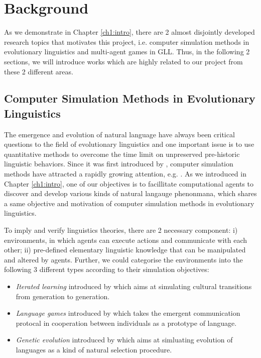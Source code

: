 \documentclass[msc,deptreport]{infthesis} %
\begin{document}

\chapter{Background}
\label{ch2:background}

As we demonstrate in Chapter \ref{ch1:intro}, there are 2 almost disjointly developed research topics that motivates this project, i.e. computer simulation methods in evolutionary linguistics and multi-agent games in GLL. Thus, in the following 2 sections, we will introduce works which are highly related to our project from these 2 different areas.

\section{Computer Simulation Methods in Evolutionary Linguistics}
\label{sec2.1:evolang}

The emergence and evolution of natural language have always been critical questions to the field of evolutionary linguistics \cite{macwhinney2013emergence} and one important issue is to use quantitative methods to overcome the time limit on unpreserved pre-historic linguistic behaviors\cite{lieberman2006toward, evans2009myth}. Since it was first introduced by \cite{hurford1989biological}, computer simulation methods have attracted a rapidly growing attention, e.g. \cite{hurford1998approaches, knight2000evolutionary, briscoe2002book, christiansen2003language, bickerton2009biological, cangelosi2012simulating}. As we introduced in Chapter \ref{ch1:intro}, one of our objectives is to facillitate computational agents to discover and develop various kinds of natural langauge phenonmana, which shares a same objective and motivation of computer simulation methods in evolutionary linguistics.

To imply and verify linguistics theories, there are 2 necessary component: i) environments, in which agents can execute actions and communicate with each other; ii) pre-defined elementary linguistic knowledge that can be manipulated and altered by agents. Further, we could categorise the environments into the following 3 different types according to their simulation objectives:
\begin{itemize}
  \item \textit{Iterated learning} introduced by \cite{kirby1999function} which aims at simulating cultural transitions from generation to generation.
  \item \textit{Language games} introduced by \cite{wittgenstein2009philosophical} which takes the emergent communication protocal in cooperation between individuals as a prototype of language.
  \item \textit{Genetic evolution} introduced by \cite{briscoe1998language} which aims at simluating evolution of languages as a kind of natural selection procedure\cite{darwin1859origin}.
\end{itemize}
\end{document}
